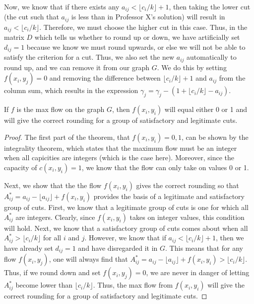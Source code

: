 \documentclass{6046}
\begin{document}
Now, we know that if there exists any $a_{ij} < \lfloor c_i / k \rfloor + 1$, then taking the lower cut (the cut such that $a_{ij}$ is less than in Professor X's solution) will result in $a_{ij} < \lfloor c_i / k \rfloor$. Therefore, we must choose the higher cut in this case. Thus, in the matrix $D$ which tells us whether to round up or down, we have artificially set $d_{ij} = 1$ because we know we must round upwards, or else we will not be able to satisfy the criterion for a cut. Thus, we also set the new $a_{ij}$ automatically to round up, and we can remove it from our graph $G$. We do this by setting $f(x_i, y_j) = 0$ and removing the difference between $\lfloor c_i / k \rfloor + 1$ and $a_{ij}$ from the column sum, which results in the expression $\gamma_{j} = \gamma_{j} - (1 + \lfloor c_i / k \rfloor - a_{ij})$. 

\begin{theorem}
If $f$ is the max flow on the graph $G$, then $f(x_i, y_i)$ will equal either 0 or 1 and will give the correct rounding for a group of satisfactory and legitimate cuts. 
\end{theorem}

\begin{proof}
The first part of the theorem, that $f(x_i, y_i) = 0, 1$, can be shown by the integrality theorem, which states that the maximum flow must be an integer when all capicities are integers (which is the case here). Moreover, since the capacity of $c(x_i, y_i) = 1$, we know that the flow can only take on values 0 or 1. 

Next, we show that the the flow $f(x_i, y_i)$ gives the correct rounding so that $ A^*_{ij} = a_{ij} - \lfloor a_{ij} \rfloor + f(x_i, y_i)$ provides the basis of a legitimate and satisfactory group of cuts. First, we know that a legitimate group of cuts is one for which all $A^*_{ij}$ are integers. Clearly, since $f(x_i, y_i)$ takes on integer values, this condition will hold. Next, we know that a satisfactory group of cuts comes about when all $A^*_{ij} > \lfloor c_i / k \rfloor$ for all $i$ and $j$. However, we know that if $a_{ij} < \lfloor c_i / k \rfloor + 1$, then we have already set $d_{ij} = 1$ and have disregarded it in $G$. This means that for any flow $f(x_i, y_j)$, one will always find that $A^*_{ij} =  a_{ij} - \lfloor a_{ij} \rfloor + f(x_i, y_i) > \lfloor c_i / k \rfloor$. Thus, if we round down and set $f(x_i, y_j) = 0$, we are never in danger of letting $A^*_{ij}$ become lower than $\lfloor c_i / k \rfloor$. Thus, the max flow from $f(x_i, y_i)$ will give the correct rounding for a group of satisfactory and legitimate cuts.
\end{proof}
\end{document}
